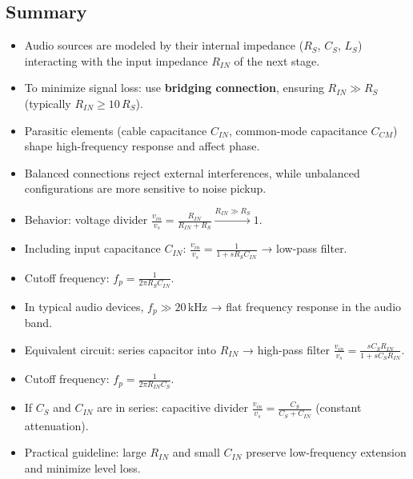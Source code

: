 \subsection{Summary}

\begin{tcolorbox}[colback=gray!10,colframe=black,title=Summary: Big Picture \& Design Rules]
\begin{itemize}
    \item Audio sources are modeled by their internal impedance ($R_S$, $C_S$, $L_S$) interacting with the input impedance $R_{IN}$ of the next stage.
    \item To minimize signal loss: use \textbf{bridging connection}, ensuring $R_{IN} \gg R_S$ (typically $R_{IN} \ge 10\,R_S$).
    \item Parasitic elements (cable capacitance $C_{IN}$, common-mode capacitance $C_{CM}$) shape high-frequency response and affect phase.
    \item Balanced connections reject external interferences, while unbalanced configurations are more sensitive to noise pickup.
\end{itemize}
\end{tcolorbox}

\begin{tcolorbox}[colback=gray!10,colframe=black,title=Summary: Resistive Sources]
\begin{itemize}
    \item Behavior: voltage divider $\displaystyle \frac{v_{in}}{v_s} = \frac{R_{IN}}{R_{IN} + R_S} \xrightarrow{R_{IN} \gg R_S} 1$.
    \item Including input capacitance $C_{IN}$: $\displaystyle \frac{v_{in}}{v_s} = \frac{1}{1 + s R_S C_{IN}}$ → low-pass filter.
    \item Cutoff frequency: $\displaystyle f_p = \frac{1}{2\pi R_S C_{IN}}$.
    \item In typical audio devices, $f_p \gg 20\,\text{kHz}$ → flat frequency response in the audio band.
\end{itemize}
\end{tcolorbox}

\begin{tcolorbox}[colback=gray!10,colframe=black,title=Summary: Capacitive Sources (e.g., microphones)]
\begin{itemize}
    \item Equivalent circuit: series capacitor into $R_{IN}$ → high-pass filter $\displaystyle \frac{v_{in}}{v_s} = \frac{s C_S R_{IN}}{1 + s C_S R_{IN}}$.
    \item Cutoff frequency: $\displaystyle f_p = \frac{1}{2\pi R_{IN} C_S}$.
    \item If $C_S$ and $C_{IN}$ are in series: capacitive divider $\displaystyle \frac{v_{in}}{v_s} = \frac{C_S}{C_S + C_{IN}}$ (constant attenuation).
    \item Practical guideline: large $R_{IN}$ and small $C_{IN}$ preserve low-frequency extension and minimize level loss.
\end{itemize}
\end{tcolorbox}

